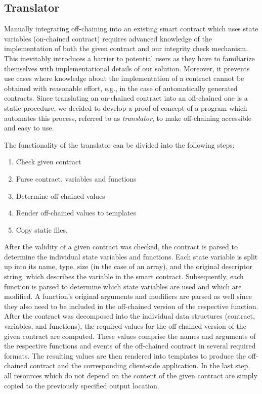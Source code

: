 \subsection{Translator}

Manually integrating off-chaining into an existing smart contract which uses state variables (on-chained contract) requires advanced knowledge of the implementation of both the given contract and our integrity check mechanism. This inevitably introduces a barrier to potential users as they have to familiarize themselves with implementational details of our solution. Moreover, it prevents use cases where knowledge about the implementation of a contract cannot be obtained with reasonable effort, e.g., in the case of automatically generated contracts. Since translating an on-chained contract into an off-chained one is a static procedure, we decided to develop a proof-of-concept of a program which automates this process, referred to as \emph{translator}, to make off-chaining accessible and easy to use.

The functionality of the translator can be divided into the following steps:
\begin{enumerate}
\setlength{\itemsep}{0pt}
\setlength{\parskip}{0pt}
	\item Check given contract
	\item Parse contract, variables and functions
	\item Determine off-chained values
	\item Render off-chained values to templates
	\item Copy static files.
\end{enumerate}
After the validity of a given contract was checked, the contract is parsed to determine the individual state variables and functions. Each state variable is split up into its name, type, size (in the case of an array), and the original descriptor string, which describes the variable in the smart contract. Subsequently, each function is parsed to determine which state variables are used and which are modified. A function's original arguments and modifiers are parsed as well since they also need to be included in the off-chained version of the respective function. After the contract was decomposed into the individual data structures (contract, variables, and functions), the required values for the off-chained version of the given contract are computed. These values comprise the names and arguments of the respective functions and events of the off-chained contract in several required formats. The resulting values are then rendered into templates to produce the off-chained contract and the corresponding client-side application. In the last step, all resources which do not depend on the content of the given contract are simply copied to the previously specified output location.

